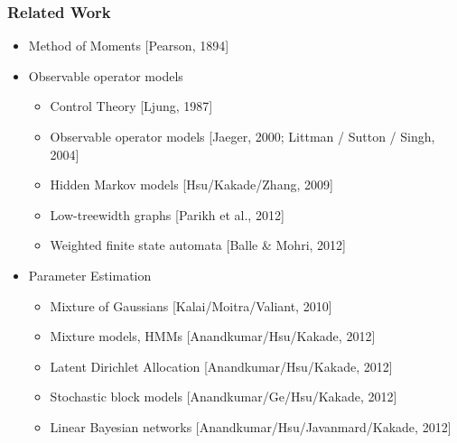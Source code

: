 \documentclass[xcolor={svgnames}]{beamer}
\begin{document}
\begin{frame}
  \frametitle{Related Work}
  \begin{itemize}
    \item<1-> Method of Moments [Pearson, 1894]
    \item<2-> Observable operator models
    \begin{itemize}
      \item Control Theory [Ljung, 1987]
      \item Observable operator models [Jaeger, 2000; Littman / Sutton / Singh, 2004]
      \item \alert<2>{Hidden Markov models [Hsu/Kakade/Zhang, 2009]}
      \item Low-treewidth graphs [Parikh et al., 2012]
      \item Weighted finite state automata [Balle \& Mohri, 2012]
    \end{itemize}
     \item<3-> Parameter Estimation
  \begin{itemize}
    \item Mixture of Gaussians [Kalai/Moitra/Valiant, 2010]
    \item \alert{Mixture models, HMMs [Anandkumar/Hsu/Kakade, 2012]}
    \item Latent Dirichlet Allocation [Anandkumar/Hsu/Kakade, 2012]
    \item Stochastic block models [Anandkumar/Ge/Hsu/Kakade, 2012]
    \item Linear Bayesian networks [Anandkumar/Hsu/Javanmard/Kakade, 2012]
  \end{itemize}
  \end{itemize}
\end{frame}
\end{document}
